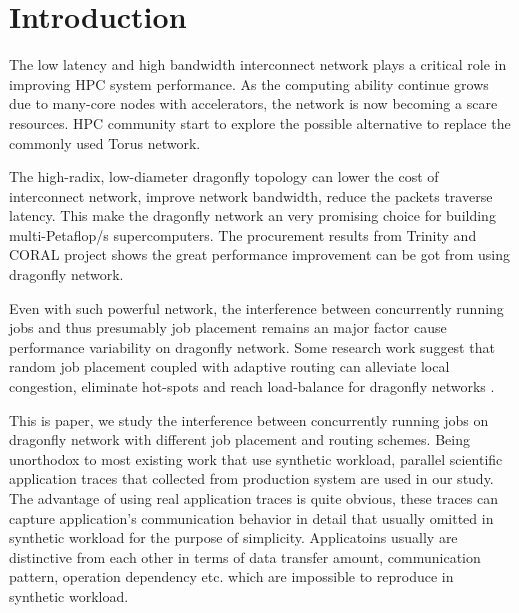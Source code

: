 \documentclass[conference,compsoc]{IEEEtran}
\begin{document}




%
\IEEEpeerreviewmaketitle



\section{Introduction}
\label{sec:intro}

The low latency and high bandwidth interconnect network plays a critical role in improving HPC system performance. As the computing ability continue grows due to many-core nodes with accelerators, the network is now becoming a scare resources. HPC community start to explore the possible alternative to replace the commonly used Torus network.

The high-radix, low-diameter dragonfly topology can lower the cost of interconnect network, improve network bandwidth, reduce the packets traverse latency. This make the dragonfly network an very promising choice for building multi-Petaflop/s supercomputers\cite{dally-dragonfly}. The procurement results from Trinity and CORAL project shows the great performance improvement can be got from using dragonfly network. 


Even with such powerful network, the interference between concurrently running jobs and thus presumably job placement remains an major factor cause performance variability on dragonfly network\cite{bhatele2015, dskinner}. Some research work suggest that random job placement coupled with adaptive routing can alleviate local congestion, eliminate hot-spots and reach load-balance for dragonfly networks \cite{jain-sc14, bhatele-sc11, brandt2014}. 

This is paper, we study the interference between concurrently running jobs on dragonfly network with different job placement and routing schemes. Being unorthodox to most existing work that use synthetic workload, parallel scientific application traces that collected from production system are used in our study. The advantage of using real application traces is quite obvious, these traces can capture application's communication behavior in detail that usually omitted in synthetic workload for the purpose of simplicity. Applicatoins usually are distinctive from each other in terms of  data transfer amount, communication pattern, operation dependency etc. which are impossible to reproduce in synthetic workload.
\end{document}
